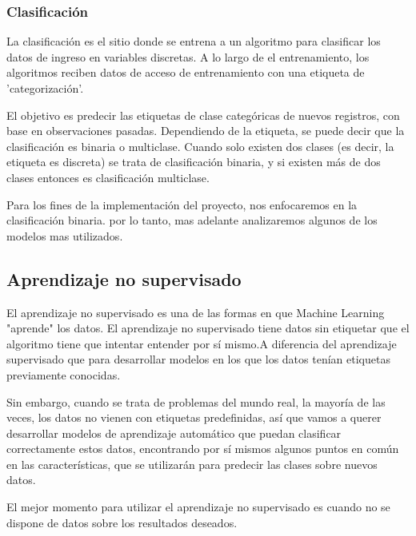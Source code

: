  \subsubsection{Clasificación}\par
 
 La clasificación es el sitio donde se entrena a un algoritmo para clasificar los datos de ingreso en variables discretas. A lo largo de el entrenamiento, los algoritmos reciben datos de acceso de entrenamiento con una etiqueta de 'categorización'.\par
 
 El objetivo es predecir las etiquetas de clase categóricas de nuevos registros, con base en observaciones pasadas. Dependiendo de la etiqueta, se puede decir que la clasificación es binaria o multiclase. Cuando solo existen dos clases (es decir, la etiqueta es discreta) se trata de clasificación binaria, y si existen más de dos clases entonces es clasificación multiclase.\par
 
 Para los fines de la implementación del proyecto, nos enfocaremos en la clasificación binaria. por lo tanto, mas adelante analizaremos algunos de los modelos mas utilizados.\par
 
 
 
\subsection{Aprendizaje no supervisado}

El aprendizaje no supervisado es una de las formas en que Machine Learning  "aprende" los datos. El aprendizaje no supervisado tiene datos sin etiquetar que el algoritmo tiene que intentar entender por sí mismo.A diferencia del aprendizaje supervisado que para desarrollar modelos en los que los datos tenían etiquetas previamente conocidas. \par

Sin embargo, cuando se trata de problemas del mundo real, la mayoría de las veces, los datos no vienen con etiquetas predefinidas, así que vamos a querer desarrollar modelos de aprendizaje automático que puedan clasificar correctamente estos datos, encontrando por sí mismos algunos puntos en común en las características, que se utilizarán para predecir las clases sobre nuevos datos.\par

El mejor momento para utilizar el aprendizaje no supervisado es cuando no se dispone de datos sobre los resultados deseados.\par

